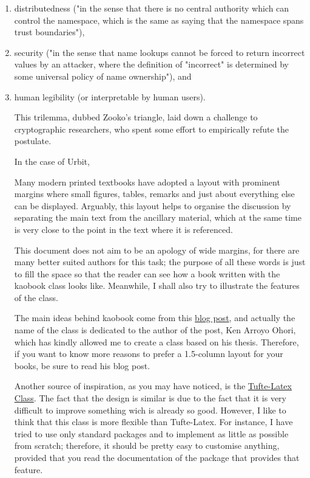 \begin{enumerate}
	\item  distributedness ("in the sense that there is no central authority which can control the namespace, which is the same as saying that the namespace spans trust boundaries"),
	\item  security ("in the sense that name lookups cannot be forced to return incorrect values by an attacker, where the definition of "incorrect" is determined by some universal policy of name ownership"), and
	\item  human legibility (or interpretable by human users).

This trilemma, dubbed Zooko's triangle, laid down a challenge to cryptographic researchers, who spent some effort to empirically refute the postulate.

In the case of Urbit,



Many modern printed textbooks have adopted a layout with prominent
margins where small figures, tables, remarks and just about everything
else can be displayed. Arguably, this layout helps to organise the
	discussion by separating the main text from the ancillary material,
	which at the same time is very close to the point in the text where
	it is referenced.

This document does not aim to be an apology of wide margins, for there
are many better suited authors for this task; the purpose of all these
words is just to fill the space so that the reader can see how a book
written with the kaobook class looks like. Meanwhile, I shall also try
to illustrate the features of the class.

The main ideas behind kaobook come from this
\href{https://3d.bk.tudelft.nl/ken/en/2016/04/17/a-1.5-column-layout-in-latex.html}{blog
	post}, and actually the name of the class is dedicated to the author
of the post, Ken Arroyo Ohori, which has kindly allowed me to create a
class based on his thesis. Therefore, if you want to know more reasons
to prefer a 1.5-column layout for your books, be sure to read his blog
post.

Another source of inspiration, as you may have noticed, is the
\href{https://github.com/Tufte-LaTeX/tufte-latex}{Tufte-Latex Class}.
The fact that the design is similar is due to the fact that it is very
difficult to improve something wich is already so good. However, I like
to think that this class is more flexible than Tufte-Latex. For
instance, I have tried to use only standard packages and to implement as
little as possible from scratch; therefore, it should be pretty easy
to customise anything, provided that you read the documentation of the
package that provides that feature.


\end{enumerate}

